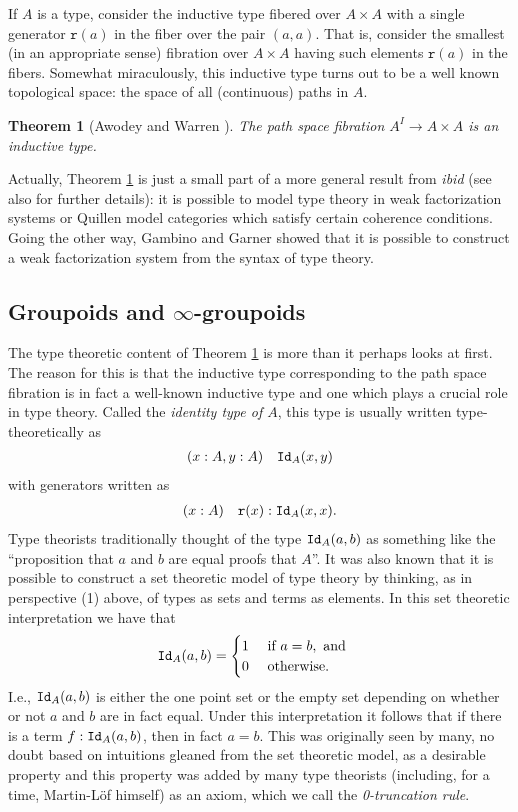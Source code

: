 \documentclass[11pt]{amsart}
\newcommand{\id}[1]{\textnormal{\texttt{Id}}_{#1}}
\newcommand{\rr}{\mathtt{r}}
\newcommand{\judge}[2]{(#1)\quad #2}
\newtheorem{theorem}{Theorem}[section]
\theoremstyle{definition}
\theoremstyle{remark}
\numberwithin{equation}{section}
\begin{document}
If $A$ is a type, consider the inductive type fibered over $A\times A$
with a single generator $\rr(a)$ in the fiber over the pair $(a,a)$.
That is, consider the smallest (in an appropriate sense) fibration
over $A\times A$ having such elements $\rr(a)$ in the fibers.
Somewhat miraculously, this inductive type turns out to be a well
known topological space: the space of all (continuous) paths in $A$.
\begin{theorem}[Awodey and Warren \cite{Awodey:2009bz}]\label{theorem:aw}
  The path space fibration $A^{I}\to A\times A$ is an inductive
  type.
\end{theorem}
Actually, Theorem \ref{theorem:aw} is just a small part of a more
general result from \emph{ibid} (see also \cite{Warren:2008ts} for
further details): it is possible to model type theory in
weak factorization systems or Quillen model categories
\cite{Quillen:1967uz} which satisfy certain coherence conditions.
Going the other way, Gambino and Garner \cite{Gambino:2008bg} showed
that it is possible to construct a weak factorization system from the
syntax of type theory.

\subsection{Groupoids and $\infty$-groupoids}\label{sec:groupoids}

The type theoretic content of Theorem \ref{theorem:aw} is more than it
perhaps looks at first.  The reason for this is that the inductive
type corresponding to the path space fibration is in fact a well-known
inductive type and one which plays a crucial role in type theory.  Called the
\emph{identity type of $A$}, this type is usually written
type-theoretically as 
\begin{align*}
  \judge{x:A,y:A}{\id{A}(x,y)}
\end{align*}
with generators written as
\begin{align*}
  \judge{x:A}{\rr(x):\id{A}(x,x)}.
\end{align*}
Type theorists traditionally thought of the type $\id{A}(a,b)$ as
something like the ``proposition that $a$ and $b$ are equal proofs
that $A$''.  It was also known that it is possible to
construct a set theoretic model of type theory by thinking, as in
perspective (1) above, of types as sets and terms as elements.  In
this set theoretic interpretation we have that
\begin{align*}
  \id{A}(a,b) & =
  \begin{cases}
    1 & \text{ if }a=b,\text{ and}\\
    0 & \text{ otherwise.}
  \end{cases}
\end{align*}
I.e., $\id{A}(a,b)$ is either the one point set or the empty set
depending on whether or not $a$ and $b$ are in fact equal.  Under this
interpretation it follows that if there is a term $f:\id{A}(a,b)$,
then in fact $a=b$.  This was originally seen by many, no doubt based
on intuitions gleaned from the set theoretic model, as a desirable
property and this property was added by many type theorists (including, for a time,
Martin-L\"{o}f himself) as an axiom, which we call the
\emph{0-truncation rule}.  
\end{document}
